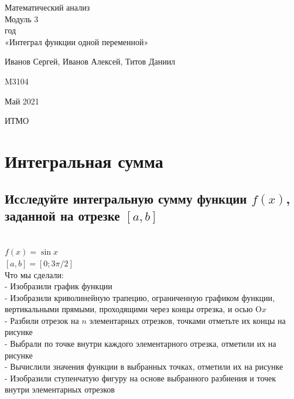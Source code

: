 \documentclass{article}
\begin{document}
\begin{center}
\hfill \break

\LARGE{Математический анализ}\\
\hfill \break
\normalsize{Модуль 3\\
\hfill {} год\\
\hfill \break
«Интеграл функции одной переменной»}\\
\hfill \break
\hfill \break
\hfill \break
\hfill \break
\end{center}

\begin{flushright} Иванов Сергей, Иванов Алексей, Титов Даниил \end{flushright}
\begin{flushright} M3104 \end{flushright}
\vfill
\bigskip
\begin{center} Май 2021 \end{center}
\begin{center} ИТМО \end{center}
\thispagestyle{empty} %
\newpage
\tableofcontents{}
\newpage
\section{Интегральная сумма}
\normalsize
\subsection{Исследуйте интегральную сумму функции $f(x)$, заданной на отрезке $[a, b]$}
\\
$ f(x) = \sin{x} $\\
$ [a, b] = [0; 3\pi/2] $\\

Что мы сделали:\\
- Изобразили график функции\\
- Изобразили криволинейную трапецию, ограниченную графиком функции, вертикальными прямыми, проходящими через концы отрезка, и осью O$x$\\
- Разбили отрезок на $n$ элементарных отрезков, точками отметьте их концы на рисунке\\
- Выбрали по точке внутри каждого элементарного отрезка, отметили их на рисунке\\
- Вычислили значения функции в выбранных точках, отметили их на рисунке\\
- Изобразили ступенчатую фигуру на основе выбранного разбиения и точек внутри элементарных отрезков\\
\end{document}
